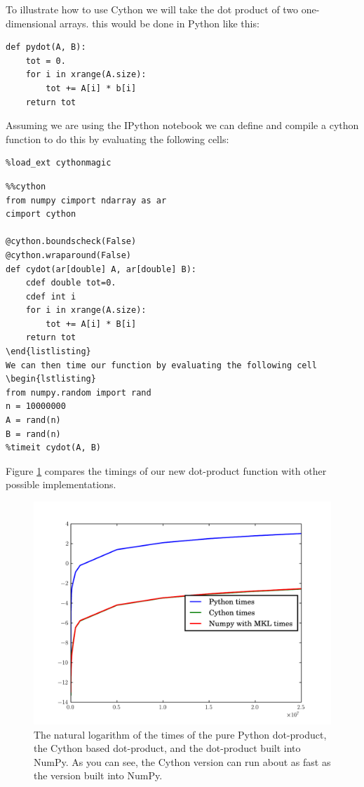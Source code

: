 To illustrate how to use Cython we will take the dot product of two one-dimensional arrays.
this would be done in Python like this:
\begin{lstlisting}
def pydot(A, B):
    tot = 0.
    for i in xrange(A.size):
        tot += A[i] * b[i]
    return tot
\end{lstlisting}
Assuming we are using the IPython notebook we can define and compile a cython function to do this by evaluating the following cells:

\begin{lstlisting}
%load_ext cythonmagic
\end{lstlisting}

\begin{lstlisting}
%%cython
from numpy cimport ndarray as ar
cimport cython

@cython.boundscheck(False)
@cython.wraparound(False)
def cydot(ar[double] A, ar[double] B):
    cdef double tot=0.
    cdef int i
    for i in xrange(A.size):
        tot += A[i] * B[i]
    return tot
\end{listlisting}
We can then time our function by evaluating the following cell
\begin{lstlisting}
from numpy.random import rand
n = 10000000
A = rand(n)
B = rand(n)
%timeit cydot(A, B)
\end{lstlisting}

Figure \ref{cython:dot} compares the timings of our new dot-product function with other possible implementations.

\begin{figure}
\includegraphics[width=\textwidth]{dot.pdf}
\caption{The natural logarithm of the times of the pure Python dot-product, the Cython based dot-product, and the dot-product built into NumPy. As you can see, the Cython version can run about as fast as the version built into NumPy.}
\label{cython:dot}
\end{figure}

